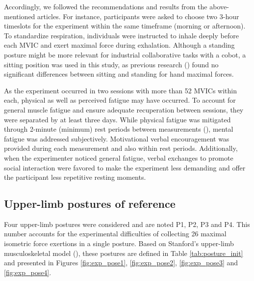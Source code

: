 Accordingly, we followed the recommendations and results from the above-mentioned articles. For instance, participants were asked to choose two 3-hour timeslots for the experiment within the same timeframe (morning or afternoon). To standardize respiration, individuals were instructed to inhale deeply before each MVIC and exert maximal force during exhalation. Although a standing posture might be more relevant for industrial collaborative tasks with a cobot, a sitting position was used in this study, as previous research (\cite{watanabeShortTermReliabilityGrip2005}) found no significant differences between sitting and standing for hand maximal forces.

As the experiment occurred in two sessions with more than 52 MVICs within each, physical as well as perceived fatigue may have occurred. To account for general muscle fatigue and ensure adequate recuperation between sessions, they were separated by at least three days. While physical fatigue was mitigated through 2-minute (minimum) rest periods between measurements (\cite{perdeauxInvestigatingRoleShoulder2010}), mental fatigue was addressed subjectively. Motivational verbal encouragement was provided during each measurement and also within rest periods. Additionally, when the experimenter noticed general fatigue, verbal exchanges to promote social interaction were favored to make the experiment less demanding and offer the participant less repetitive resting moments.

\subsection{Upper-limb postures of reference}
Four upper-limb postures were considered and are noted P1, P2, P3 and P4. This number accounts for the experimental difficulties of collecting 26 maximal isometric force exertions in a single posture. Based on Stanford's upper-limb musculoskeletal model (\cite{holzbaurModelUpperExtremity2005}), these postures are defined in Table \ref{tab:posture_init} and presented in Figures \ref{fig:exp_pose1}, \ref{fig:exp_pose2}, \ref{fig:exp_pose3} and \ref{fig:exp_pose4}.

